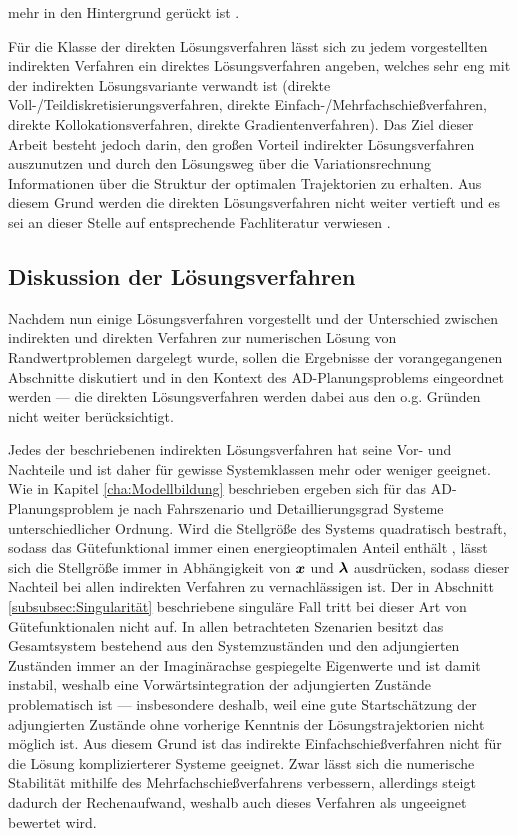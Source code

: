 mehr in den Hintergrund gerückt ist \cite{Papageorgiou.2012}. 

Für die Klasse der direkten Lösungsverfahren lässt sich zu jedem vorgestellten indirekten Verfahren ein direktes Lösungsverfahren angeben, welches sehr eng mit der indirekten Lösungsvariante verwandt ist (direkte Voll-/Teildiskretisierungsverfahren, direkte Einfach-/Mehrfachschießverfahren, direkte Kollokationsverfahren, direkte Gradientenverfahren). Das Ziel dieser Arbeit besteht jedoch darin, den großen Vorteil indirekter Lösungsverfahren auszunutzen und durch den Lösungsweg über die Variationsrechnung Informationen über die Struktur der optimalen Trajektorien zu erhalten. Aus diesem Grund werden die direkten Lösungsverfahren nicht weiter vertieft und es sei an dieser Stelle auf entsprechende Fachliteratur verwiesen \cite{KnutGraichen.2012,Gerdts.2010,Papageorgiou.2012,Ascher.1995c4,Ascher.1995c5,Betts.1998,Cervantes.2009}.
\subsection{Diskussion der Lösungsverfahren}\label{subsec:Diskussion}
Nachdem nun einige Lösungsverfahren vorgestellt und der Unterschied zwischen indirekten und direkten Verfahren zur numerischen Lösung von Randwertproblemen dargelegt wurde, sollen die Ergebnisse der vorangegangenen Abschnitte diskutiert und in den Kontext des \gls{AD}-Planungsproblems eingeordnet werden --- die direkten Lösungsverfahren werden dabei aus den o.g. Gründen nicht weiter berücksichtigt. 

Jedes der beschriebenen indirekten Lösungsverfahren hat seine Vor- und Nachteile und ist daher für gewisse Systemklassen mehr oder weniger geeignet. Wie in Kapitel \ref{cha:Modellbildung} beschrieben ergeben sich für das \gls{AD}-Planungsproblem je nach Fahrszenario und Detaillierungsgrad Systeme unterschiedlicher Ordnung. Wird die Stellgröße des Systems quadratisch bestraft, sodass das Gütefunktional immer einen energieoptimalen Anteil enthält \cite{KnutGraichen.2012}, lässt sich die Stellgröße immer in Abhängigkeit von $\boldsymbol{x}$ und $\boldsymbol{\lambda}$ ausdrücken, sodass dieser Nachteil bei allen indirekten Verfahren zu vernachlässigen ist. Der in Abschnitt \ref{subsubsec:Singularität} beschriebene singuläre Fall tritt bei dieser Art von Gütefunktionalen nicht auf. In allen betrachteten Szenarien besitzt das Gesamtsystem bestehend aus den Systemzuständen und den adjungierten Zuständen immer an der Imaginärachse gespiegelte Eigenwerte und ist damit instabil, weshalb eine Vorwärtsintegration der adjungierten Zustände problematisch ist --- insbesondere deshalb, weil eine gute Startschätzung der adjungierten Zustände ohne vorherige Kenntnis der Lösungstrajektorien nicht möglich ist. Aus diesem Grund ist das indirekte Einfachschießverfahren nicht für die Lösung komplizierterer Systeme geeignet. Zwar lässt sich die numerische Stabilität mithilfe des Mehrfachschießverfahrens verbessern, allerdings steigt dadurch der Rechenaufwand, weshalb auch dieses Verfahren als ungeeignet bewertet wird. 

